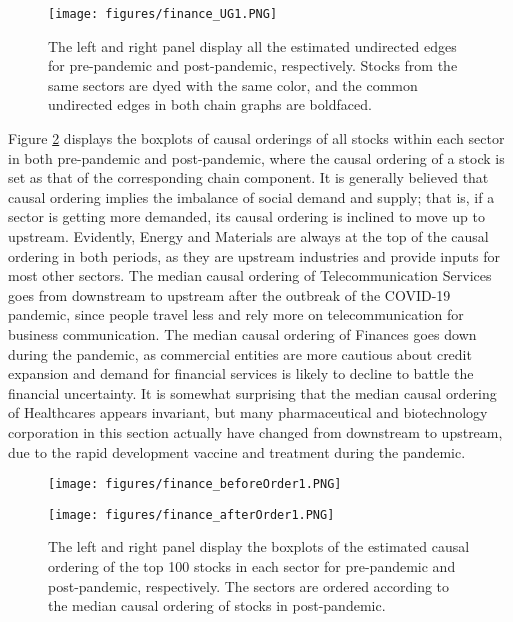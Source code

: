 \documentclass[12pt]{article}
\newcommand{\1}{\uppercase\expandafter{\romannumeral1}}
\newcommand{\2}{\uppercase\expandafter{\romannumeral2}}
\newcommand{\0}{\textbf{0}}
\begin{document}
\begin{figure}
	\centering
	\texttt{[image: figures/finance\_UG1.PNG]}
	\caption{The left and right panel display all the estimated undirected edges for pre-pandemic and post-pandemic, respectively. Stocks from the same sectors are dyed with the same color, and the common undirected edges in both chain graphs are boldfaced.}\label{fig:financeUG}
\end{figure}

Figure \ref{fig:financeOrder} displays the boxplots of causal orderings of all stocks within each sector in both pre-pandemic and post-pandemic, where the causal ordering of a stock is set as that of the corresponding chain component. It is generally believed that causal ordering implies the imbalance of social demand and supply; that is, if a sector is getting more demanded, its causal ordering is inclined to move up to upstream. Evidently, Energy and Materials are always at the top of the causal ordering in both periods, as they are upstream industries and provide inputs for most other sectors. The median causal ordering of Telecommunication Services goes from downstream to upstream after the outbreak of the COVID-19 pandemic, since people travel less and rely more on telecommunication for business communication. The median causal ordering of Finances goes down during the pandemic, as commercial entities are more cautious about credit expansion and demand for financial services is likely to decline to battle the financial uncertainty. It is somewhat surprising that the median causal ordering of Healthcares appears invariant, but many pharmaceutical and biotechnology corporation in this section actually have changed from downstream to upstream, due to the rapid development vaccine and treatment during the pandemic. 

\begin{figure}[!htb]
	\centering
	\begin{minipage}[b]{0.49\textwidth}
		\centering
		\texttt{[image: figures/finance\_beforeOrder1.PNG]}
	\end{minipage}
	\begin{minipage}[b]{0.49\textwidth}
		\centering
		\texttt{[image: figures/finance\_afterOrder1.PNG]}
	\end{minipage}
	\caption{The left and right panel display the boxplots of the estimated causal ordering of the top 100 stocks in each sector for pre-pandemic and post-pandemic, respectively. The sectors are ordered according to the median causal ordering of stocks in post-pandemic.}\label{fig:financeOrder}
\end{figure}
\end{document}
